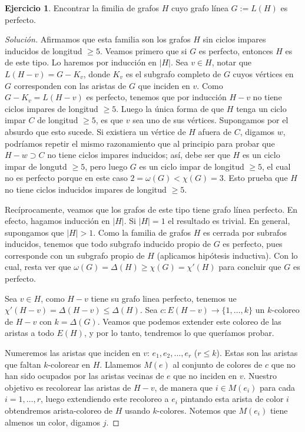 \documentclass[12pt]{report}
\theoremstyle{plain}
\theoremstyle{definition}
\newtheorem{exercise}[theorem]{Ejercicio}
\newenvironment{solution}{\begin{proof}[Solución]}{\end{proof}}
\newcommand{\abs}[1]{\left \vert #1 \right \vert}
\begin{document}
\begin{exercise}
Encontrar la fimilia de grafos $H$ cuyo grafo línea $G:= L(H)$ es perfecto.
\end{exercise}
\begin{solution}
Afirmamos que esta familia son los grafos $H$ sin ciclos impares inducidos de longitud $\geq 5$. Veamos primero que si $G$ es perfecto, entonces $H$ es de este tipo. Lo haremos por inducción en $\abs H$. Sea $v \in H$, notar que $L(H-v) = G - K_v$, donde $K_v$ es el subgrafo completo de $G$ cuyos vértices en $G$ corresponden con las aristas de $G$ que inciden en $v$. Como $G - K_v = L(H-v)$ es perfecto, tenemos que por inducción $H-v$ no tiene ciclos impares de longitud $\geq 5$. Luego la única forma de que $H$ tenga un ciclo impar $C$ de longitud $\geq 5$, es que $v$ sea uno de sus vértices. Supongamos por el absurdo que esto sucede. Si existiera un vértice de $H$ afuera de $C$, digamos $w$, podríamos repetir el mismo razonamiento que al principio para probar que $H - w \supset C$ no tiene ciclos impares inducidos; así, debe ser que $H$ es un ciclo impar de longutd $\geq 5$, pero luego $G$ es un ciclo impar de longitud $\geq 5$, el cual no es perfecto porque en este caso $2 = \omega (G) < \chi (G) = 3$. Esto prueba que $H$ no tiene ciclos inducidos impares de longitud $\geq 5$.

Recíprocamente, veamos que los grafos de este tipo tiene grafo línea perfecto. En efecto, hagamos inducción en $\abs H$. Si $\abs H = 1$ el resultado es trivial. En general, supongamos que $\abs H > 1$. Como la familia de grafos $H$ es cerrada por subrafos inducidos, tenemos que todo subgrafo inducido propio de $G$ es perfecto, pues corresponde con un subgrafo propio de $H$ (aplicamos hipótesis inductiva). Con lo cual, resta ver que $\omega (G) = \Delta (H) \geq \chi (G) = \chi ' (H)$ para concluir que $G$ es perfecto.

Sea $v \in H$, como $H - v$ tiene su grafo linea perfecto, tenemos ue $\chi ' (H-v) = \Delta (H - v) \leq \Delta (H)$. Sea $c : E(H - v) \rightarrow \{1, \ldots, k\}$ un $k$-coloreo de $H-v$ con $k = \Delta (G)$. Veamos que podemos extender este coloreo de las aristas a todo $E(H)$, y por lo tanto, tendremos lo que queríamos probar.

Numeremos las aristas que inciden en $v$: $e_1, e_2, \ldots, e_r$ ($r \leq k$). Estas son las aristas que faltan $k$-colorear en $H$. Llamemos $M(e)$ al conjunto de colores de $c$ que no han sido ocupados por las aristas vecinas de $e$ que no inciden en $v$. Nuestro objetivo es recolorear las aristas de $H-v$, de manera que $i \in M(e_i)$ para cada $i = 1, \ldots, r$, luego extendiendo este recoloreo a $e_i$ pintando esta arista de color $i$ obtendremos arista-coloreo de $H$ usando $k$-colores. Notemos que $M(e_i)$ tiene almenos un color, digamos $j$.


\end{solution}
\end{document}

